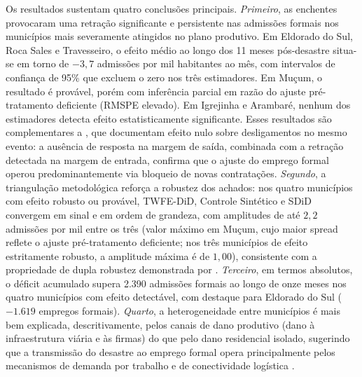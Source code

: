 \documentclass[a4paper,12pt]{article}
\begin{document}
Os resultados sustentam quatro conclusões principais. \emph{Primeiro}, as enchentes
provocaram uma retração significante e persistente nas admissões formais nos municípios
mais severamente atingidos no plano produtivo. Em Eldorado do Sul, Roca Sales e
Travesseiro, o efeito médio ao longo dos 11 meses pós-desastre situa-se em torno de
$-3{,}7$ admissões por mil habitantes ao mês, com intervalos de confiança de 95\% que
excluem o zero nos três estimadores. Em Muçum, o resultado é provável, porém com
inferência parcial em razão do ajuste pré-tratamento deficiente (RMSPE elevado). Em
Igrejinha e Arambaré, nenhum dos estimadores detecta efeito estatisticamente significante.
Esses resultados são complementares a , que documentam efeito
nulo sobre desligamentos no mesmo evento: a ausência de resposta na margem de saída,
combinada com a retração detectada na margem de entrada, confirma que o ajuste do
emprego formal operou predominantemente via bloqueio de novas contratações.
\emph{Segundo}, a triangulação metodológica reforça a robustez dos achados: nos quatro
municípios com efeito robusto ou provável, TWFE-DiD, Controle Sintético e SDiD convergem
em sinal e em ordem de grandeza, com amplitudes de até $2{,}2$ admissões por mil entre os três
(valor máximo em Muçum, cujo maior spread reflete o ajuste pré-tratamento
deficiente; nos três municípios de efeito estritamente robusto, a amplitude
máxima é de $1{,}00$), consistente com a propriedade de dupla robustez
demonstrada por . \emph{Terceiro}, em termos absolutos, o déficit acumulado
supera 2.390 admissões formais ao longo de onze meses nos quatro municípios com efeito
detectável, com destaque para Eldorado do Sul ($-1.619$ empregos formais). \emph{Quarto},
a heterogeneidade entre municípios é mais bem explicada, descritivamente, pelos canais de
dano produtivo (dano à infraestrutura viária e às firmas) do que pelo dano residencial
isolado, sugerindo que a transmissão do desastre ao emprego formal opera principalmente
pelos mecanismos de demanda por trabalho \cite{haddad2015economic} e de conectividade
logística \cite{xiao2014}.
\end{document}
